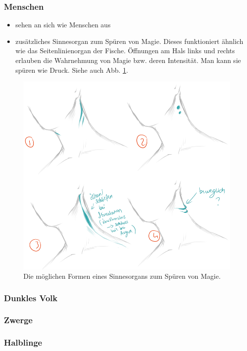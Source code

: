 \subsubsection{Menschen} \label{rasse:mensch}
\begin{itemize}
	\item sehen an sich wie Menschen aus
	\item zusätzliches Sinnesorgan zum Spüren von Magie. Dieses funktioniert ähnlich wie das Seitenlinienorgan der Fische. Öffnungen am Hals links und rechts erlauben die Wahrnehmung von Magie bzw. deren Intensität. Man kann sie spüren wie Druck. Siehe auch Abb. \ref{fig:sinnesorganauswahl}.
\end{itemize}

\begin{figure}
	\centering
	\includegraphics[width=0.7\linewidth]{Abbildungen/Weltenbau/Lebensformen/Sinnesorgan_Auswahl}
	\caption[mögliche Form des Sinnesorgans]{Die möglichen Formen eines Sinnesorgans zum Spüren von Magie.}
	\label{fig:sinnesorganauswahl}
\end{figure}

\subsubsection{Dunkles Volk}

\subsubsection{Zwerge} \label{rasse:zwerge}


\subsubsection{Halblinge} \label{rasse:halblinge}

